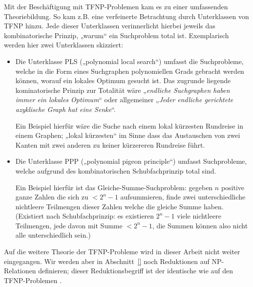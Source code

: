 Mit der Beschäftigung mit TFNP-Problemen kam es zu einer umfassenden Theoriebildung. So kam z.B. eine verfeinerte Betrachtung durch Unterklassen von TFNP hinzu. Jede dieser Unterklassen verinnerlicht hierbei jeweils das kombinatorische Prinzip, „warum“ ein Suchproblem total ist. Exemplarisch werden hier zwei Unterklassen skizziert:
\begin{itemize}
    \item Die Unterklasse PLS („polynomial local search“) umfasst die Suchprobleme, welche in die Form eines Suchgraphen polynomiellen Grads gebracht werden können, worauf ein lokales Optimum gesucht ist.
    Das zugrunde liegende kominatorische Prinzip zur Totalität wäre „\emph{endliche Suchgraphen haben immer ein lokales Optimum}“ oder allgemeiner „\emph{Jeder endliche gerichtete azyklische Graph hat eine Senke}“.

    Ein Beispiel hierfür wäre die Suche nach einem lokal kürzesten Rundreise in einem Graphen; „lokal kürzesten“ im Sinne dass das Austauschen von zwei Kanten mit zwei anderen zu keiner kürzereren Rundreise führt.

    \item Die Unterklasse PPP („polynomial pigeon principle“) umfasst Suchprobleme, welche aufgrund des kombinatorischen Schubfachprinzip total sind. 

        Ein Beispiel hierfür ist das Gleiche-Summe-Suchproblem: gegeben $n$ positive ganze Zahlen die sich zu $<2^n-1$ aufsummieren, finde zwei unterschiedliche nichtleere Teilmengen dieser Zahlen welche die gleiche Summe haben. (Existiert nach Schubfachprinzip: es existieren $2^n-1$ viele nichtleere Teilmengen, jede davon mit Summe $<2^n-1$, die Summen können also nicht alle unterschiedlich sein.)
\end{itemize}
Auf die weitere Theorie der TFNP-Probleme wird in dieser Arbeit nicht weiter eingegangen. Wir werden aber in Abschnitt~\ref{} noch Reduktionen auf NP-Relationen definieren; dieser Reduktionsbegriff ist der identische wie auf den TFNP-Problemen \textcite{megiddo_total_1991}.



